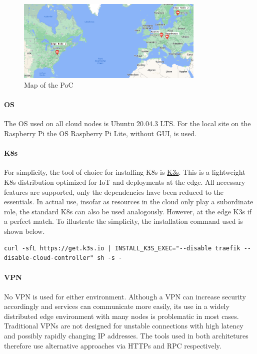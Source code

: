 \documentclass[MSC,Master,english]{twbook}%
\begin{document}
\begin{figure}[ht]
    \centering
    \includegraphics[width=0.80\textwidth]{PICs/poc-map.png}
    \caption{Map of the \ac{PoC}\cite{googlemaps}}
    \label{fig:poc-map}
\end{figure}

\paragraph{OS} The \ac{OS} used on all cloud nodes is Ubuntu 20.04.3 LTS. For the local site on the Raspberry Pi the \ac{OS} Raspberry Pi Lite, without \ac{GUI}, is used.

\paragraph{\ac{K8s}} For simplicity, the tool of choice for installing \ac{K8s} is \hyperref{https://k3s.io/}{}{}{K3s}. This is a lightweight \ac{K8s} distribution optimized for \ac{IoT} and deployments at the edge. All necessary features are supported, only the dependencies have been reduced to the essentials. In actual use, insofar as resources in the cloud only play a subordinate role, the standard \ac{K8s} can also be used analogously. However, at the edge K3s if a perfect match. To illustrate the simplicity, the installation command used is shown below.  

\begin{lstlisting}[caption={K3s installation},captionpos=b]
curl -sfL https://get.k3s.io | INSTALL_K3S_EXEC="--disable traefik --disable-cloud-controller" sh -s -
\end{lstlisting}

\paragraph{VPN} No \ac{VPN} is used for either environment. Although a VPN can increase security accordingly and services can communicate more easily, its use in a widely distributed edge environment with many nodes is problematic in most cases. Traditional VPNs are not designed for unstable connections with high latency and possibly rapidly changing \ac{IP} addresses. The tools used in both architetures therefore use alternative approaches via HTTPs and RPC respectively.
\end{document}

